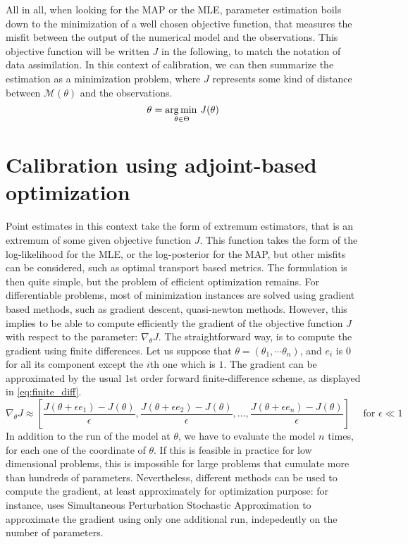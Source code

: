 \documentclass[../../Main_ManuscritThese.tex]{subfiles}
\begin{document}
All in all, when looking for the MAP or the MLE, parameter estimation
boils down to the minimization of a well chosen objective function,
that measures the misfit between the output of the numerical model and
the observations. This objective function will be written $J$ in the
following, to match the notation of data assimilation.  In this
context of calibration, we can then summarize the estimation as a
minimization problem, where $J$ represents some kind of distance
between $\mathcal{M}(\theta)$ and the observations.
\begin{equation}
  {\theta}_{\mathrm{}} = \operatorname*{arg\,min \,}_{\theta\in \Theta} J(\theta)
\end{equation}

\section{Calibration using adjoint-based optimization}
\label{sec:calibration_adjoint_optimization}
Point estimates in this context take the form of extremum estimators,
that is an extremum of some given objective function $J$. This
function takes the form of the log-likelihood for the MLE, or the
log-posterior for the MAP, but other misfits can be considered, such
as optimal transport based metrics. The formulation is then quite
simple, but the problem of efficient optimization remains. For
differentiable problems, most of minimization instances are solved
using gradient based methods, such as gradient descent, quasi-newton
methods.  However, this implies to be able to compute efficiently the
gradient of the objective function $J$ with respect to the parameter:
$\nabla_{\theta} J$. The straightforward way, is to compute the
gradient using finite differences. Let us suppose that
$\theta = (\theta_1,\cdots \theta_n)$, and $e_i$ is 0 for all its
component except the $i$th one which is $1$. The gradient can be
approximated by the usual 1st order forward finite-difference scheme,
as displayed in \cref{eq:finite_diff}.
\begin{equation}
  \label{eq:finite_diff}
  \nabla_{\theta} J  \approx \left[\frac{J(\theta + \epsilon e_1) - J(\theta)}{\epsilon}, \frac{J(\theta + \epsilon e_2) - J(\theta)}{ \epsilon},\dots, \frac{J(\theta + \epsilon e_n)- J(\theta)}{\epsilon} \right] \quad \text{ for } \epsilon \ll 1
\end{equation}
In addition to the run of the model at $\theta$, we have to evaluate
the model $n$ times, for each one of the coordinate of $\theta$. If
this is feasible in practice for low dimensional problems, this is
impossible for large problems that cumulate more than hundreds of
parameters. Nevertheless, different methods can be used to compute the
gradient, at least approximately for optimization purpose: for
instance, \cite{boutet_estimation_2015} uses Simultaneous Perturbation
Stochastic Approximation to approximate the gradient using only one
additional run, indepedently on the number of parameters.
\end{document}
